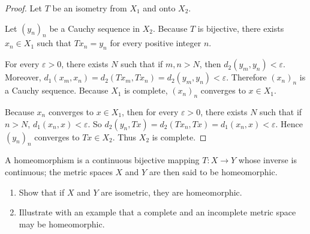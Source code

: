 \begin{proof}
    Let $T$ be an isometry from $X_{1}$ and onto $X_{2}$.

    Let ${(y_{n})}_{n}$ be a Cauchy sequence in $X_{2}$. Because $T$ is bijective, there exists $x_{n}\in X_{1}$ such that $Tx_{n} = y_{n}$ for every positive integer $n$.

    For every $\varepsilon > 0$, there exists $N$ such that if $m, n > N$, then $d_{2}(y_{m}, y_{n}) < \varepsilon$. Moreover, $d_{1}(x_{m}, x_{n}) = d_{2}(Tx_{m}, Tx_{n}) = d_{2}(y_{m}, y_{n}) < \varepsilon$. Therefore ${(x_{n})}_{n}$ is a Cauchy sequence. Because $X_{1}$ is complete, ${(x_{n})}_{n}$ converges to $x\in X_{1}$.

    Because $x_{n}$ converges to $x\in X_{1}$, then for every $\varepsilon > 0$, there exists $N$ such that if $n > N$, $d_{1}(x_{n}, x) < \varepsilon$. So $d_{2}(y_{n}, Tx) = d_{2}(Tx_{n}, Tx) = d_{1}(x_{n}, x) < \varepsilon$. Hence ${(y_{n})}_{n}$ converges to $Tx\in X_{2}$. Thus $X_{2}$ is complete.
\end{proof}

\begin{exercise}[Homeomorphism]\label{chapter1:section6:exercise5}
    A homeomorphism is a continuous bijective mapping $T: X \to Y$ whose inverse is continuous; the metric spaces $X$ and $Y$ are then said to be homeomorphic.
    \begin{enumerate}[label={(\alph*)}]
        \item Show that if $X$ and $Y$ are isometric, they are homeomorphic.
        \item Illustrate with an example that a complete and an incomplete metric space may be homeomorphic.
    \end{enumerate}
\end{exercise}

